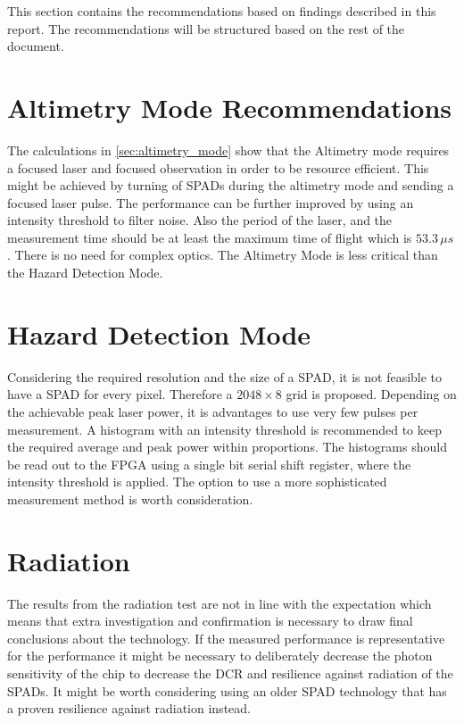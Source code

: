 This section contains the recommendations based on findings described in this report. The recommendations will be structured based on the rest of the document.

\section{Altimetry Mode Recommendations}
The calculations in \cref{sec:altimetry_mode} show that the Altimetry mode requires a focused laser and focused observation in order to be resource efficient. This might be achieved by turning of SPADs during the altimetry mode and sending a focused laser pulse. The performance can be further improved by using an intensity threshold to filter noise. Also the period of the laser, and the measurement time should be at least the maximum time of flight which is $53.3\,\mu s$. There is no need for complex optics. The Altimetry Mode is less critical than the Hazard Detection Mode. 

\section{Hazard Detection Mode}
Considering the required resolution and the size of a SPAD, it is not feasible to have a SPAD for every pixel. Therefore a $2048\times8$ grid is proposed. Depending on the achievable peak laser power, it is advantages to use very few pulses per measurement. A histogram with an intensity threshold is recommended to keep the required average and peak power within proportions. The histograms should be read out to the FPGA using a single bit serial shift register, where the intensity threshold is applied. The option to use a more sophisticated measurement method is worth consideration.

\section{Radiation}
The results from the radiation test are not in line with the expectation which means that extra investigation and confirmation is necessary to draw final conclusions about the technology. If the measured performance is representative for the performance it might be necessary to deliberately decrease the photon sensitivity of the chip to decrease the DCR and resilience against radiation of the SPADs. It might be worth considering using an older SPAD technology that has a proven resilience against radiation instead.

